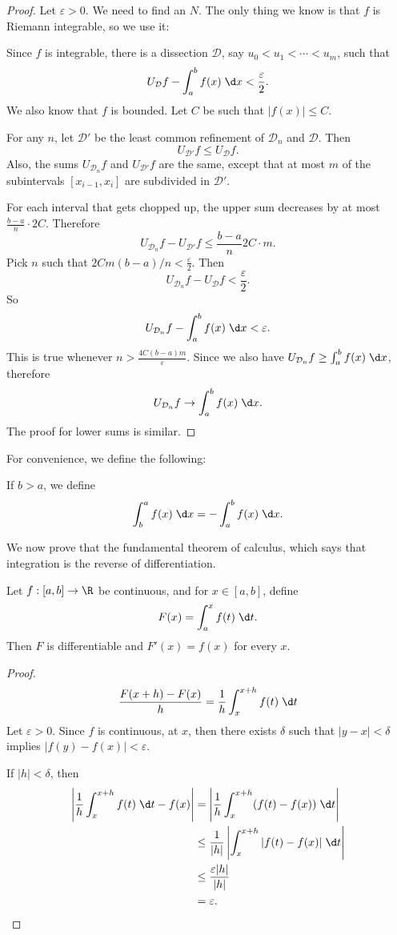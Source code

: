\documentclass[a4paper]{article}
\begin{document}
\begin{proof}
  Let $\varepsilon > 0$. We need to find an $N$. The only thing we know is that $f$ is Riemann integrable, so we use it:

  Since $f$ is integrable, there is a dissection $\mathcal{D}$, say $u_0 < u_1 < \cdots < u_m$, such that
  \[
    U_\mathcal{D} f - \int_a^b f(x)\;\d x < \frac{\varepsilon}{2}.
  \]
  We also know that $f$ is bounded. Let $C$ be such that $|f(x)| \leq C$.

  For any $n$, let $\mathcal{D}'$ be the least common refinement of $\mathcal{D}_n$ and $\mathcal{D}$. Then
  \[
    U_{\mathcal{D}'}f \leq U_\mathcal{D} f.
  \]
  Also, the sums $U_{\mathcal{D}_n}f$ and $U_\mathcal{D'}f$ are the same, except that at most $m$ of the subintervals $[x_{i - 1}, x_i]$ are subdivided in $\mathcal{D}'$.

  For each interval that gets chopped up, the upper sum decreases by at most $\frac{b - a}{n}\cdot 2C$. Therefore
  \[
    U_{\mathcal{D}_n}f - U_{\mathcal{D}'}f \leq \frac{b - a}{n}2C\cdot m.
  \]
  Pick $n$ such that $2Cm(b - a)/n < \frac{\varepsilon}{2}$. Then
  \[
    U_{\mathcal{D}_n} f - U_\mathcal{D}f < \frac{\varepsilon}{2}.
  \]
  So
  \[
    U_{\mathcal{D}_n}f - \int_a^b f(x)\;\d x < \varepsilon.
  \]
  This is true whenever $n > \frac{4C(b - a)m}{\varepsilon}$. Since we also have $U_{\mathcal{D}_n} f \geq \int_a^b f(x)\;\d x$, therefore
  \[
    U_{\mathcal{D}_n}f \to \int_a^b f(x)\;\d x.
  \]
  The proof for lower sums is similar.
\end{proof}

For convenience, we define the following:
\begin{notation}
  If $b > a$, we define
  \[
    \int_b^a f(x)\;\d x = -\int_a^b f(x)\;\d x.
  \]
\end{notation}

We now prove that the fundamental theorem of calculus, which says that integration is the reverse of differentiation.
\begin{thm}
  Let $f: [a, b]\to \R$ be continuous, and for $x\in [a, b]$, define
  \[
    F(x) = \int_a^x f(t)\;\d t.
  \]
  Then $F$ is differentiable and $F'(x) = f(x)$ for every $x$.
\end{thm}

\begin{proof}
  \[
    \frac{F(x + h) - F(x)}{h} = \frac{1}{h}\int_x^{x + h}f(t)\;\d t
  \]
  Let $\varepsilon > 0$. Since $f$ is continuous, at $x$, then there exists $\delta$ such that $|y - x| < \delta$ implies $|f(y) - f(x)| < \varepsilon$.

  If $|h| < \delta$, then
  \begin{align*}
    \left|\frac{1}{h}\int_x^{x + h}f(t) \;\d t - f(x)\right| &= \left|\frac{1}{h}\int_x^{x + h}(f(t) - f(x))\;\d t\right|\\
    &\leq \frac{1}{|h|}\left|\int_x^{x + h}|f(t) - f(x)|\;\d t\right|\\
    &\leq \frac{\varepsilon|h|}{|h|}\\
    &= \varepsilon.
  \end{align*}
\end{proof}
\end{document}
